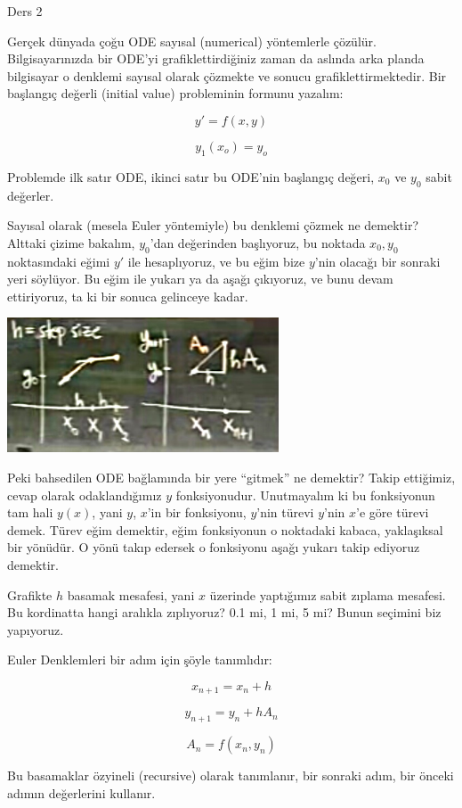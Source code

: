 \documentclass[12pt,fleqn]{article}\usepackage{../../common}
\begin{document}
Ders 2

Gerçek dünyada çoğu ODE sayısal (numerical) yöntemlerle
çözülür. Bilgisayarınızda bir ODE'yi grafiklettirdiğiniz zaman da aslında arka
planda bilgisayar o denklemi sayısal olarak çözmekte ve sonucu
grafiklettirmektedir. Bir başlangıç değerli (initial value) probleminin formunu
yazalım: 

$$ y' = f(x,y) $$

$$ y_1(x_o) = y_o $$

Problemde ilk satır ODE, ikinci satır bu ODE'nin başlangıç değeri, $x_0$ ve $y_0$
sabit değerler. 

Sayısal olarak (mesela Euler yöntemiyle) bu denklemi çözmek ne demektir?
Alttaki çizime bakalım, $y_0$'dan değerinden başlıyoruz, bu noktada
$x_0,y_0$ noktasındaki eğimi $y'$ ile hesaplıyoruz, ve bu eğim bize $y$'nin
olacağı bir sonraki yeri söylüyor. Bu eğim ile yukarı ya da aşağı
çıkıyoruz, ve bunu devam ettiriyoruz, ta ki bir sonuca gelinceye kadar.

\includegraphics[height=4cm]{2_1.jpg}

Peki bahsedilen ODE bağlamında bir yere ``gitmek'' ne demektir? Takip ettiğimiz,
cevap olarak odaklandığımız $y$ fonksiyonudur. Unutmayalım ki bu fonksiyonun tam
hali $y(x)$, yani $y$, $x$'in bir fonksiyonu, $y$'nin türevi $y$'nin $x$'e göre
türevi demek. Türev eğim demektir, eğim fonksiyonun o noktadaki kabaca,
yaklaşıksal bir yönüdür. O yönü takıp edersek o fonksiyonu aşağı yukarı takip
ediyoruz demektir.

Grafikte $h$ basamak mesafesi, yani $x$ üzerinde yaptığımız sabit zıplama
mesafesi. Bu kordinatta hangi aralıkla zıplıyoruz? 0.1 mi, 1 mi, 5 mi? Bunun
seçimini biz yapıyoruz. 

Euler Denklemleri bir adım için şöyle tanımlıdır:

$$ x_{n+1} = x_n + h $$

$$ y_{n+1} = y_n + hA_n $$

$$ A_n = f(x_n, y_n) $$

Bu basamaklar özyineli (recursive) olarak tanımlanır, bir sonraki adım, bir
önceki adımın değerlerini kullanır. 
\end{document}
